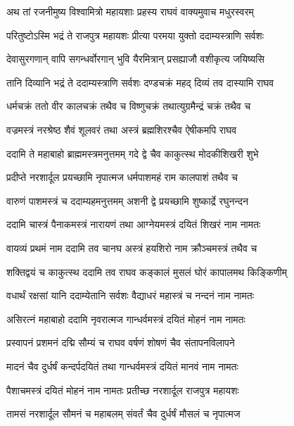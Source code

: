 
\twolineshloka
{अथ तां रजनीमुष्य विश्वामित्रो महायशाः}
{प्रहस्य राघवं वाक्यमुवाच मधुरस्वरम्} %

\twolineshloka
{परितुष्टोऽस्मि भद्रं ते राजपुत्र महायशः}
{प्रीत्या परमया युक्तो ददाम्यस्त्राणि सर्वशः} %

\twolineshloka
{देवासुरगणान् वापि सगन्धर्वोरगान् भुवि}
{यैरमित्रान् प्रसह्याजौ वशीकृत्य जयिष्यसि} %

\twolineshloka
{तानि दिव्यानि भद्रं ते ददाम्यस्त्राणि सर्वशः}
{दण्डचक्रं महद् दिव्यं तव दास्यामि राघव} %

\twolineshloka
{धर्मचक्रं ततो वीर कालचक्रं तथैव च}
{विष्णुचक्रं तथात्युग्रमैन्द्रं चक्रं तथैव च} %

\twolineshloka
{वज्रमस्त्रं नरश्रेष्ठ शैवं शूलवरं तथा}
{अस्त्रं ब्रह्मशिरश्चैव ऐषीकमपि राघव} %

\twolineshloka
{ददामि ते महाबाहो ब्राह्ममस्त्रमनुत्तमम्}
{गदे द्वे चैव काकुत्स्थ मोदकीशिखरी शुभे} %

\twolineshloka
{प्रदीप्ते नरशार्दूल प्रयच्छामि नृपात्मज}
{धर्मपाशमहं राम कालपाशं तथैव च} %

\twolineshloka
{वारुणं पाशमस्त्रं च ददाम्यहमनुत्तमम्}
{अशनी द्वे प्रयच्छामि शुष्कार्द्रे रघुनन्दन} %

\twolineshloka
{ददामि चास्त्रं पैनाकमस्त्रं नारायणं तथा}
{आग्नेयमस्त्रं दयितं शिखरं नाम नामतः} %

\twolineshloka
{वायव्यं प्रथमं नाम ददामि तव चानघ}
{अस्त्रं हयशिरो नाम क्रौञ्चमस्त्रं तथैव च} %

\twolineshloka
{शक्तिद्वयं च काकुत्स्थ ददामि तव राघव}
{कङ्कालं मुसलं घोरं कापालमथ किङ्किणीम्} %

\twolineshloka
{वधार्थं रक्षसां यानि ददाम्येतानि सर्वशः}
{वैद्याधरं महास्त्रं च नन्दनं नाम नामतः} %

\twolineshloka
{असिरत्नं महाबाहो ददामि नृवरात्मज}
{गान्धर्वमस्त्रं दयितं मोहनं नाम नामतः} %

\twolineshloka
{प्रस्वापनं प्रशमनं दद्मि सौम्यं च राघव}
{वर्षणं शोषणं चैव संतापनविलापने} %

\twolineshloka
{मादनं चैव दुर्धर्षं कन्दर्पदयितं तथा}
{गान्धर्वमस्त्रं दयितं मानवं नाम नामतः} %

\twolineshloka
{पैशाचमस्त्रं दयितं मोहनं नाम नामतः}
{प्रतीच्छ नरशार्दूल राजपुत्र महायशः} %

\twolineshloka
{तामसं नरशार्दूल सौमनं च महाबलम्}
{संवर्तं चैव दुर्धर्षं मौसलं च नृपात्मज} %

